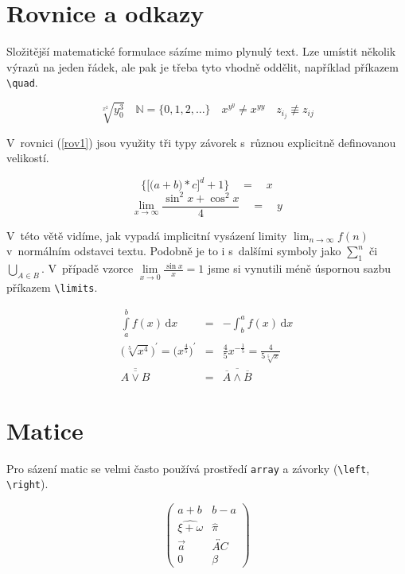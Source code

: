 \documentclass[11pt, a4paper, twocolumn, czech]{article}
\theoremstyle{definition}
\begin{document}
\section{Rovnice a odkazy}

Složitější matematické formulace sázíme mimo plynulý text. Lze umístit několik výrazů na jeden řádek, ale pak je třeba tyto vhodně oddělit, například příkazem \verb|\quad|. 

$$\sqrt[x^2]{y^3_0}\quad \mathbb {N}=\{0,1,2,\ldots\} \quad x^{y^y} \neq x^{yy} \quad z_{i_j} \not \equiv z_{ij}$$

V~rovnici (\ref{rov1}) jsou využity tři typy závorek s~různou explicitně definovanou velikostí.

\begin{equation}
\bigg\{\Big[\big(a+b)*c \Big]^d+1\bigg\}\quad=\quad x \label{rov1}
\end{equation}
$$\lim_{x \rightarrow \infty} \frac{\sin^2x + \cos^2x}{4}\quad =\quad y $$

V~této větě vidíme, jak vypadá implicitní vysázení limity $\lim_{n \rightarrow \infty} f(n)$ v~normálním odstavci textu. Podobně je to i s~dalšími symboly jako $\sum_1^n$ či $\bigcup_{A \in B}$. V~případě vzorce $\lim \limits_{x \to 0} \frac{\sin x}{x}=1$ jsme si vynutili méně úspornou sazbu příkazem \verb|\limits|.

\begin{eqnarray}
\int \limits^b_a f(x)\,\mathrm{d}x &=&-\int^a_b f(x)\,\mathrm{d}x\\
\Big(\sqrt[5]{x^4} \Big)^{'}= \Big( x^\frac{4}{5} \Big)^{'} &=& \frac{4}{5}x^{- \frac{1}{5}} = \frac{4}{5\sqrt[5]{x}}\\
\overline{\overline{A \vee B}} &=& \overline{\overline{A} \wedge \overline{B}}
\end{eqnarray}

\section{Matice}

Pro sázení matic se velmi často používá prostředí \texttt{array} a závorky (\verb|\left|, \verb|\right|). 

$$\left( \begin{array}{cc}
a+b & b-a \\
\widehat{\xi + \omega} & \hat{\pi} \\
\vec{a} & \overleftrightarrow{AC}   \\ 
 0 & \beta \end{array} \right) $$ 
 
\end{document}
